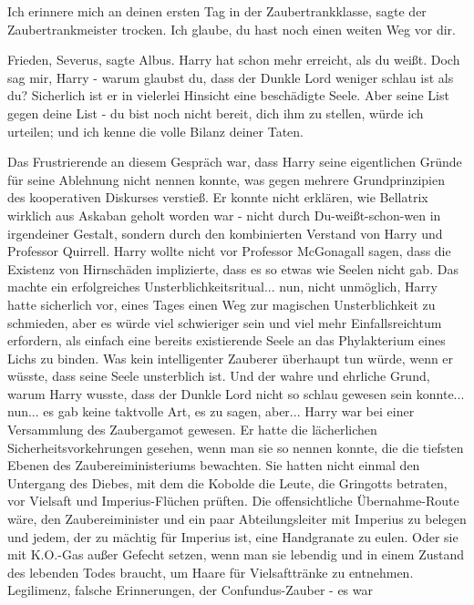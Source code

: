 \glqq{}Ich erinnere mich an deinen ersten Tag in der Zaubertrankklasse\grqq{},
sagte der Zaubertrankmeister trocken. \glqq{}Ich glaube, du hast noch einen
weiten Weg vor dir.\grqq{}

\glqq{}Frieden, Severus\grqq{}, sagte Albus. \glqq{}Harry hat schon mehr erreicht,
als du weißt. Doch sag mir, Harry - warum glaubst du, dass der Dunkle Lord
weniger schlau ist als du? Sicherlich ist er in vielerlei Hinsicht eine
beschädigte Seele. Aber seine List gegen deine List - du bist noch nicht bereit,
dich ihm zu stellen, würde ich urteilen; und ich kenne die volle Bilanz deiner
Taten.\grqq{}

Das Frustrierende an diesem Gespräch war, dass Harry seine eigentlichen Gründe
für seine Ablehnung nicht nennen konnte, was gegen mehrere Grundprinzipien des
kooperativen Diskurses verstieß. Er konnte nicht erklären, wie Bellatrix
wirklich aus Askaban geholt worden war - nicht durch Du-weißt-schon-wen in
irgendeiner Gestalt, sondern durch den kombinierten Verstand von Harry und
Professor Quirrell. Harry wollte nicht vor Professor McGonagall sagen, dass die
Existenz von Hirnschäden implizierte, dass es so etwas wie Seelen nicht gab. Das
machte ein erfolgreiches Unsterblichkeitsritual... nun, nicht unmöglich, Harry
hatte sicherlich vor, eines Tages einen Weg zur magischen Unsterblichkeit zu
schmieden, aber es würde viel schwieriger sein und viel mehr Einfallsreichtum
erfordern, als einfach eine bereits existierende Seele an das Phylakterium eines
Lichs zu binden. Was kein intelligenter Zauberer überhaupt tun würde, wenn er
wüsste, dass seine Seele unsterblich ist. Und der wahre und ehrliche Grund,
warum Harry wusste, dass der Dunkle Lord nicht so schlau gewesen sein konnte...
nun... es gab keine taktvolle Art, es zu sagen, aber... Harry war bei einer
Versammlung des Zaubergamot gewesen. Er hatte die lächerlichen \glqq{}
Sicherheitsvorkehrungen\grqq{} gesehen, wenn man sie so nennen konnte, die die
tiefsten Ebenen des Zaubereiministeriums bewachten. Sie hatten nicht einmal den
\glqq{}Untergang des Diebes\grqq{}, mit dem die Kobolde die Leute, die Gringotts
betraten, vor Vielsaft und Imperius-Flüchen prüften. Die offensichtliche
Übernahme-Route wäre, den Zaubereiminister und ein paar Abteilungsleiter mit
Imperius zu belegen und jedem, der zu mächtig für Imperius ist, eine Handgranate
zu eulen. Oder sie mit K.O.-Gas außer Gefecht setzen, wenn man sie lebendig und
in einem Zustand des lebenden Todes braucht, um Haare für Vielsafttränke zu
entnehmen. Legilimenz, falsche Erinnerungen, der Confundus-Zauber - es war
